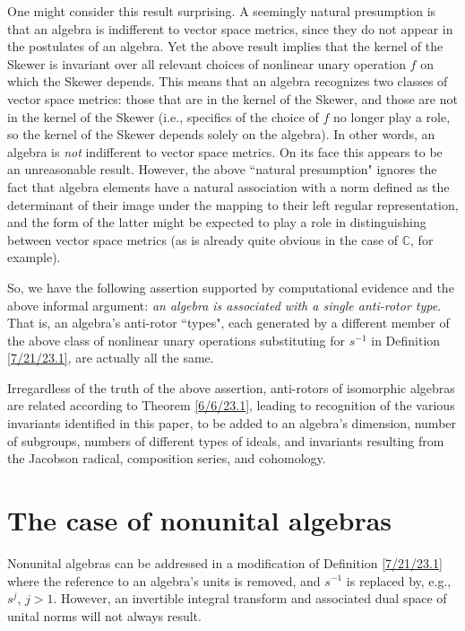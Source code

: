 \documentclass{amsart}
\numberwithin{equation}{section}
\theoremstyle{definition}
\numberwithin{theorem}{section}
\begin{document}
One might consider this result surprising.  A seemingly natural presumption is that an algebra is indifferent to vector space metrics, since they do not appear in the postulates of an algebra.  Yet the above result implies that the kernel of the Skewer is invariant over all relevant choices of nonlinear unary operation $f$ on which the Skewer depends.   This means that an algebra recognizes two classes of vector space metrics: those that are in the kernel of the Skewer, and those are not in the kernel of the Skewer (i.e., specifics of the choice of $f$ no longer play a role, so the kernel of the Skewer depends solely on the algebra).  In other words, an algebra is {\it not} indifferent to vector space metrics.  On its face this appears to be an unreasonable result.  However, the above ``natural presumption" ignores the fact that algebra elements have a natural association with a norm defined as the determinant of their image under the mapping to their left regular representation, and the form of the latter might be expected to play a role in distinguishing between vector space metrics (as is already quite obvious in the case of $\mathbb{C}$, for example).

So, we have the following assertion supported by computational evidence and the above informal argument: {\it an algebra is associated with a single anti-rotor type}.  That is, an algebra's anti-rotor ``types", each generated by a different member of the above class of nonlinear unary operations substituting for $s^{-1}$ in Definition \ref{7/21/23.1}, are actually all the same.  


Irregardless of the truth of the above assertion, anti-rotors of isomorphic algebras are related according to Theorem \ref{6/6/23.1}, leading to recognition of the various invariants identified in this paper, to be added to an algebra's dimension, number of subgroups, numbers of different types of ideals, and invariants resulting from the Jacobson radical, composition series, and cohomology.


\section{The case of nonunital algebras} Nonunital algebras can be addressed in a modification of Definition \ref{7/21/23.1} where the reference to an algebra's units is removed, and $s^{-1}$ is replaced by, e.g., $s^j$, $j>1$.   However, an invertible integral transform and associated dual space of unital norms will not always result.  
\end{document}
